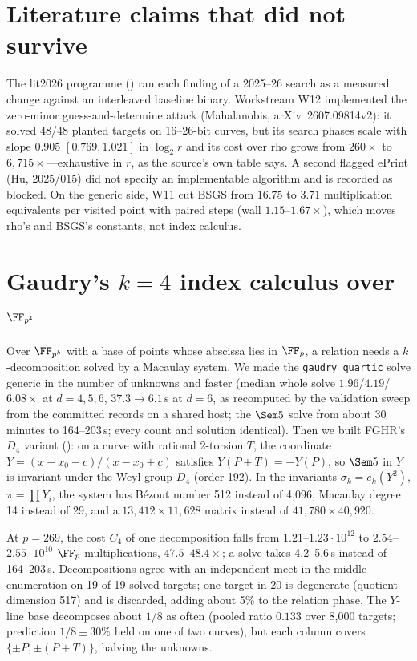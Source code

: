 \section{Literature claims that did not survive}

The lit2026 programme () ran each
finding of a 2025--26 search as a measured change against an interleaved
baseline binary. Workstream W12 implemented the zero-minor
guess-and-determine attack (Mahalanobis, arXiv~2607.09814v2): it solved
48/48 planted targets on 16--26-bit curves, but its search phases scale
with slope $0.905$ $[0.769,1.021]$ in $\log_2 r$ and its cost over rho
grows from $260\times$ to $6{,}715\times$---exhaustive in $r$, as the
source's own table says. A second flagged ePrint (Hu, 2025/015) did not
specify an implementable algorithm and is recorded as blocked. On the
generic side, W11 cut BSGS from $16.75$ to $3.71$ multiplication
equivalents per visited point with paired steps (wall $1.15$--$1.67\times$),
which moves rho's and BSGS's constants, not index calculus.

\section{Gaudry's $k=4$ index calculus over $\FF_{p^4}$}\label{sec:gaudry}

Over $\FF_{p^k}$ with a base of points whose abscissa lies in $\FF_p$, a
relation needs a $k$-decomposition solved by a Macaulay system. We made the
\texttt{gaudry\_quartic} solve generic in the number of unknowns and faster
(median whole solve $1.96$/$4.19$/$6.08\times$ at $d=4,5,6$, $37.3\to6.1$\,s
at $d=6$, as recomputed by the validation sweep from the committed records
on a shared host; the $\Sem5$ solve from about 30 minutes to 164--203\,s;
every count and solution identical). Then we built FGHR's $D_4$ variant
(): on a curve with rational
2-torsion $T$, the coordinate $Y=(x-x_0-c)/(x-x_0+c)$ satisfies
$Y(P+T)=-Y(P)$, so $\Sem5$ in $Y$ is invariant under the Weyl group $D_4$
(order 192). In the invariants $\sigma_k=e_k(Y^2)$, $\pi=\prod Y_i$, the
system has B\'ezout number 512 instead of 4{,}096, Macaulay degree 14
instead of 29, and a $13{,}412\times11{,}628$ matrix instead of
$41{,}780\times40{,}920$.

At $p=269$, the cost $C_4$ of one decomposition falls from
$1.21$--$1.23\cdot10^{12}$ to $2.54$--$2.55\cdot10^{10}$ $\FF_p$
multiplications, $47.5$--$48.4\times$; a solve takes 4.2--5.6\,s instead of
164--203\,s. Decompositions agree with an independent meet-in-the-middle
enumeration on 19 of 19 solved targets; one target in 20 is degenerate
(quotient dimension 517) and is discarded, adding about 5\% to the
relation phase. The $Y$-line base decomposes about $1/8$ as often (pooled
ratio $0.133$ over 8{,}000 targets; prediction $1/8\pm30\%$ held on one of
two curves), but each column covers $\{\pm P,\pm(P+T)\}$, halving the
unknowns.

